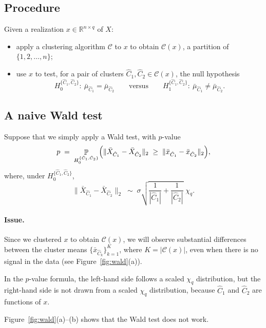 \documentclass[11pt,a4paper]{article}
\newcommand{\C}{\mathcal{C}}                       %
\newcommand{\norm}[1]{\lVert #1 \rVert_2}          %
\newcommand{\Hzero}{H_0^{\{\hat{C}_1,\hat{C}_2\}}} %
\newcommand{\Hone}{H_1^{\{\hat{C}_1,\hat{C}_2\}}}  %
\DeclareMathOperator{\Prob}{\mathbb{P}}
\begin{document}
\subsection{Procedure}

Given a realization $x \in \mathbb{R}^{n\times q}$ of $X$:
\begin{itemize}
  \item apply a clustering algorithm $\C$ to $x$ to obtain $\C(x)$, a partition of $\{1,2,\dots,n\}$;
  \item use $x$ to test, for a pair of clusters $\hat{C}_1,\hat{C}_2\in\C(x)$, the null hypothesis
  \[
    \Hzero:\ \bar{\mu}_{\hat{C}_1}=\bar{\mu}_{\hat{C}_2}
    \qquad\text{versus}\qquad
    \Hone:\ \bar{\mu}_{\hat{C}_1}\neq\bar{\mu}_{\hat{C}_2}.
  \]
\end{itemize}

\subsection{A naive Wald test}

Suppose that we simply apply a Wald test, with $p$-value
\[
  p \;=\; \Prob_{\Hzero}\Bigl(\norm{\bar{X}_{\hat{C}_1}-\bar{X}_{\hat{C}_2}}
  \;\ge\; \norm{\bar{x}_{\hat{C}_1}-\bar{x}_{\hat{C}_2}}\Bigr),
\]
where, under $\Hzero$,
\[
  \norm{\bar{X}_{\hat{C}_1}-\bar{X}_{\hat{C}_2}}
  \;\sim\; \sigma\sqrt{\frac{1}{|\hat{C}_1|}+\frac{1}{|\hat{C}_2|}}\;\chi_q .
\]

\paragraph{Issue.}
Since we clustered $x$ to obtain $\C(x)$, we will observe substantial differences between the cluster means $\{\bar{x}_{\hat{C}_k}\}_{k=1}^{K}$, where $K=|\C(x)|$, even when there is no signal in the data (see Figure~\ref{fig:wald}(a)).

In the $p$-value formula, the left-hand side follows a scaled $\chi_q$ distribution, but the right-hand side is not drawn from a scaled $\chi_q$ distribution, because $\hat{C}_1$ and $\hat{C}_2$ are functions of $x$.

\medskip
\noindent{}
\medskip

Figure~\ref{fig:wald}(a)--(b) shows that the Wald test does not work.
\end{document}
